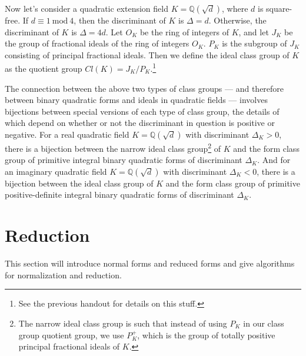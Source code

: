 \documentclass{article}
\theoremstyle{definition}
\theoremstyle{theorem}
\theoremstyle{example}
\theoremstyle{corollary}
\begin{document}
\bigskip

Now let's consider a quadratic extension field \(K = \mathbb{Q}(\sqrt{d})\), where \(d\) is square-free. If \(d \equiv 1 \ \textrm{mod} \ 4\), then the discriminant of \(K\) is \(\Delta = d\). Otherwise, the discriminant of \(K\) is \(\Delta = 4d\). Let \(O_{K}\) be the ring of integers of \(K\), and let \(J_{K}\) be the group of fractional ideals of the ring of integers \(O_{K}\). \(P_{K}\) is the subgroup of \(J_{K}\) consisting of principal fractional ideals. Then we define the ideal class group of \(K\) as the quotient group \(Cl(K) = J_{K} / P_{K}\).\footnote{See the previous handout for details on this stuff.}

\bigskip

The connection between the above two types of class groups --- and therefore between binary quadratic forms and ideals in quadratic fields --- involves bijections between special versions of each type of class group, the details of which depend on whether or not the discriminant in question is positive or negative. For a real quadratic field \(K = \mathbb{Q}(\sqrt{d})\) with discriminant \(\Delta_{K} > 0\), there is a bijection between the narrow ideal class group\footnote{The narrow ideal class group is such that instead of using \(P_{K}\) in our class group quotient group, we use \(P_{K}^{+}\), which is the group of totally positive principal fractional ideals of \(K\).} of \(K\) and the form class group of primitive integral binary quadratic forms of discriminant \(\Delta_{K}\). And for an imaginary quadratic field \(K = \mathbb{Q}(\sqrt{d})\) with discriminant \(\Delta_{K} < 0\), there is a bijection between the ideal class group of \(K\) and the form class group of primitive positive-definite integral binary quadratic forms of discriminant \(\Delta_{K}\).










\bigskip








\section{Reduction}

\bigskip

This section will introduce normal forms and reduced forms and give algorithms for normalization and reduction.
\end{document}
